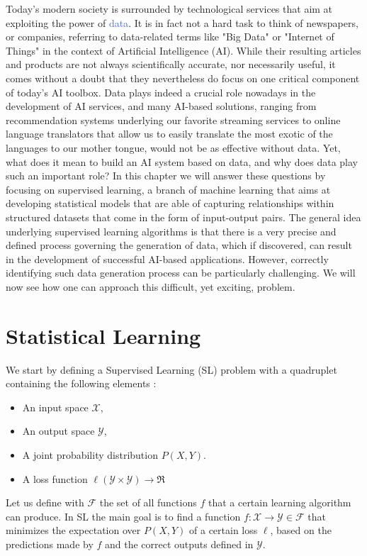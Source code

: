 Today's modern society is surrounded by technological services that aim at exploiting the power of \textcolor{RoyalBlue}{data}. It is in fact not a hard task to think of newspapers, or companies, referring to data-related terms like "Big Data" or "Internet of Things" in the context of Artificial Intelligence (AI). While their resulting articles and products are not always scientifically accurate, nor necessarily useful, it comes without a doubt that they nevertheless do focus on one critical component of today's AI toolbox. Data plays indeed a crucial role  nowadays in the development of AI services, and many AI-based solutions, ranging from recommendation systems underlying our favorite streaming services to online language translators that allow us to easily translate the most exotic of the languages to our mother tongue, would not be as effective without data. Yet, what does it mean to build an AI system based on data, and why does data play such an important role? In this chapter we will answer these questions by focusing on supervised learning, a branch of machine learning that aims at developing statistical models that are able of capturing relationships within structured datasets that come in the form of input-output pairs. The general idea underlying supervised learning algorithms is that there is a very precise and defined process governing the generation of data, which if discovered, can result in the development of successful AI-based applications. However, correctly identifying such data generation process can be particularly challenging. We will now see how one can approach this difficult, yet exciting, problem.    

\section{Statistical Learning}
\label{sec:learning_from_data}

We start by defining a Supervised Learning (SL) problem with a quadruplet containing the following elements \cite{friedman2001elements, louppe2014understanding}:
\begin{itemize}
	\item An input space $\mathcal{X}$,
	\item An output space $\mathcal{Y}$,
	\item A joint probability distribution $P(X,Y)$.
	\item A loss function $\ell(\mathcal{Y} \times \mathcal{Y}) \rightarrow \Re$
\end{itemize}
Let us define with $\mathcal{F}$ the set of all functions $f$ that a certain learning algorithm can produce. In SL the main goal is to find a function $f:\mathcal{X}\rightarrow\mathcal{Y} \in \mathcal{F}$ that minimizes the expectation over $P(X,Y)$ of a certain loss $\ell$, based on the predictions made by $f$ and the correct outputs defined in $\mathcal{Y}$.

